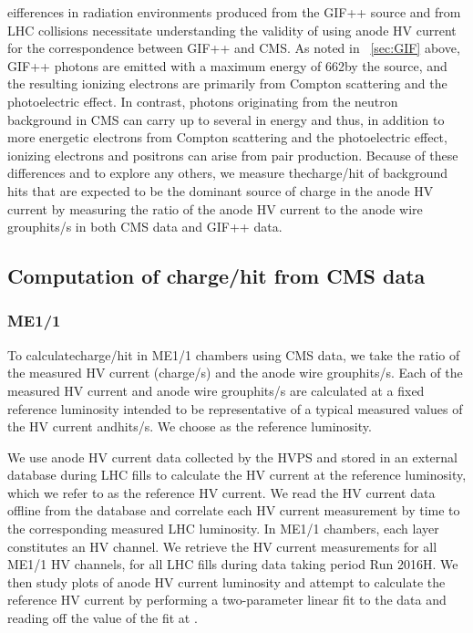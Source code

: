 eifferences in radiation environments produced from the GIF++ source and from LHC \pp collisions necessitate understanding the validity of using anode HV current for the correspondence between GIF++ and CMS. As noted in \Sec~\ref{sec:GIF} above, GIF++ photons are emitted with a maximum energy of 662\keV by the  source, and the resulting ionizing electrons are primarily from Compton scattering and the photoelectric effect. In contrast, photons originating from the neutron background in CMS can carry up to several \MeVns in energy and thus, in addition to more energetic electrons from Compton scattering and the photoelectric effect, ionizing electrons and positrons can arise from pair production. Because of these differences and to explore any others, we measure the\unit{charge/hit} of background hits that are expected to be the dominant source of charge in the anode HV current by measuring the ratio of the anode HV current to the anode wire group\unit{hits/s} in both CMS data and GIF++ data. 

\subsection{Computation of charge/hit from CMS data}

\subsubsection{ME1/1}
To calculate\unit{charge/hit} in ME1/1 chambers using CMS data, we take the ratio of the measured HV current (\unit{charge/s}) and the anode wire group\unit{hits/s}. Each of the measured HV current and anode wire group\unit{hits/s} are calculated at a fixed reference luminosity intended to be representative of a typical measured values of the HV current and\unit{hits/s}. We choose  as the reference luminosity.

We use anode HV current data collected by the HVPS and stored in an external database during LHC fills to calculate the HV current at the reference luminosity, which we refer to as the reference HV current. We read the HV current data offline from the database and correlate each HV current measurement by time to the corresponding measured LHC luminosity. In ME1/1 chambers, each layer constitutes an HV channel. We retrieve the HV current measurements for all ME1/1 HV channels, for all LHC fills during data taking period Run 2016H. We then study plots of anode HV current \vs luminosity and attempt to calculate the reference HV current by performing a two-parameter linear fit to the data and reading off the value of the fit at . 

